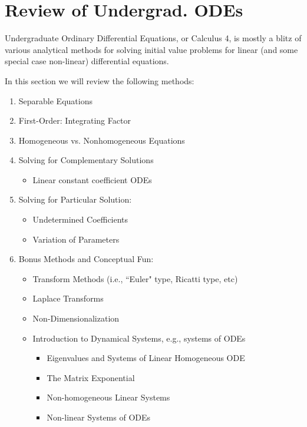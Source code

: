 \graphicspath{{./Undergrad_ODEs/}}

\section{Review of Undergrad. ODEs}

Undergraduate Ordinary Differential Equations, or Calculus 4, is mostly a blitz of various analytical methods for solving initial value problems for linear (and some special case non-linear) differential equations. 

In this section we will review the following methods:

\begin{enumerate}
\item Separable Equations
\item First-Order: Integrating Factor
\item Homogeneous vs. Nonhomogeneous Equations
\item Solving for Complementary Solutions
\begin{itemize}
\item Linear constant coefficient ODEs
\end{itemize}
\item Solving for Particular Solution:
\begin{itemize}
\item Undetermined Coefficients
\item Variation of Parameters
\end{itemize}
\item Bonus Methods and Conceptual Fun:
\begin{itemize}
\item Transform Methods (i.e., ``Euler" type, Ricatti type, etc)
\item Laplace Transforms
\item Non-Dimensionalization
\item Introduction to Dynamical Systems, e.g., systems of ODEs
\begin{itemize}
\item Eigenvalues and Systems of Linear Homogeneous ODE
\item The Matrix Exponential
\item Non-homogeneous Linear Systems
\item Non-linear Systems of ODEs
\end{itemize}
\end{itemize}
\end{enumerate}

